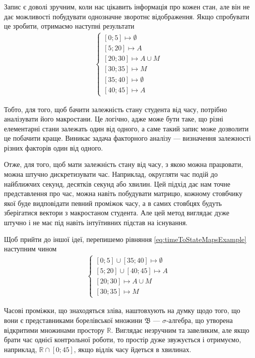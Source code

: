 Запис є доволі зручним, коли нас цікавить інформація про кожен стан, але він
не дає можливості побудувати однозначне зворотнє відображення.
Якщо спробувати це зробити, отримаємо наступні результати
\begin{align}\label{eq:timeToStateMapsExample}
  \begin{cases}
    \left[ 0; 5 \right] \mapsto \emptyset \\
    \left[ 5; 20 \right] \mapsto A \\
    \left[ 20; 30 \right] \mapsto A \cup M \\
    \left[ 30; 35 \right] \mapsto M \\
    \left[ 35; 40 \right] \mapsto \emptyset \\
    \left[ 40; 45 \right] \mapsto A
  \end{cases}
\end{align}

Тобто, для того, щоб бачити залежність стану студента від часу,
потрібно аналізувати його макростани.
Це логічно, адже може бути таке, що різні елементарні стани залежать один від
одного, а саме такий запис може дозволити це побачити краще.
Виникає задача факторного аналізу --- визначення залежності різних факторів один
від одного.

Отже, для того, щоб мати залежність стану від часу, з якою можна працювати,
можна штучно дискретизувати час.
Наприклад, округляти час подій до найближчих секунд, десятків секунд або хвилин.
Цей підхід дає нам точне представлення про час, можна навіть побудувати матрицю,
кожному стовбчику якої буде видповідати певний проміжок часу, а в самих
стовбцях будуть зберігатися вектори з макростаном студента.
Але цей метод виглядає дуже штучно і не має під навіть інтуїтивних підстав на
існування.

Щоб прийти до іншої ідеї, перепишемо рівняння \eqref{eq:timeToStateMapsExample}
наступним чином
\begin{align}\label{eq:timeToStateMapsExampleShort}
  \begin{cases}
    \left[ 0; 5 \right] \cup \left[ 35; 40 \right] \mapsto \emptyset \\
    \left[ 5; 20 \right] \cup \left[ 40; 45 \right] \mapsto A \\
    \left[ 20; 30 \right] \mapsto A \cup M \\
    \left[ 30; 35 \right] \mapsto M
  \end{cases}
\end{align}

Часові проміжки, що знаходяться зліва, наштовхують на думку щодо того, що вони
є представниками борелівської множини $\mathfrak{B}$ --- $\sigma$-алгебра, що
утворена відкритими множинами простору $\mathbb{R}$.
Виглядає незручним та завеликим, але якщо брати час однієї контрольної роботи,
то простір дуже звужується і отримуємо, наприклад,
$\mathbb{R} \cap \left[ 0; 45 \right]$, якщо відлік часу йдеться в хвилинах.


